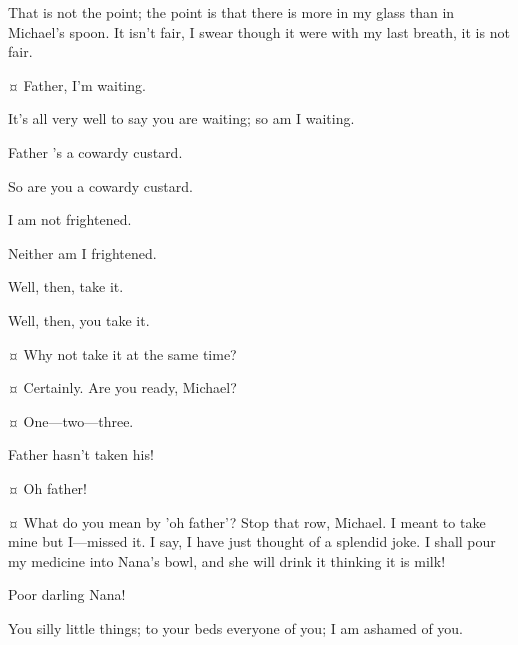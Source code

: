 \begin{drama}
\mrdarlingspeaks
That is not the point; the point is that there is more in my glass than in Michael's spoon.
It isn't fair, I swear though it were with my last breath, it is not fair.

\michaelspeaks {}¤
Father, I'm waiting.

\mrdarlingspeaks
It's all very well to say you are waiting; so am I waiting.

\michaelspeaks
Father 's a cowardy custard.

\mrdarlingspeaks
So are you a cowardy custard.


\michaelspeaks
I am not frightened.

\mrdarlingspeaks
Neither am I frightened.

\michaelspeaks
Well, then, take it.

\mrdarlingspeaks
Well, then, you take it.

\wendyspeaks {}¤
Why not take it at the same time?

\mrdarlingspeaks {}¤
Certainly.
Are you ready, Michael?

\wendyspeaks {}¤
One—two—three.


\johnspeaks
Father hasn't taken his!


\wendyspeaks {}¤
Oh father!

\mrdarlingspeaks {}¤
What do you mean by 'oh father'?
Stop that row, Michael.
I meant to take mine but I—missed it.
I say, I have just thought of a splendid joke.
I shall pour my medicine into Nana's bowl, and she will drink it thinking it is milk!

\wendyspeaks
Poor darling Nana!

\mrdarlingspeaks
You silly little things; to your beds everyone of you; I am ashamed of you.



\end{drama}

